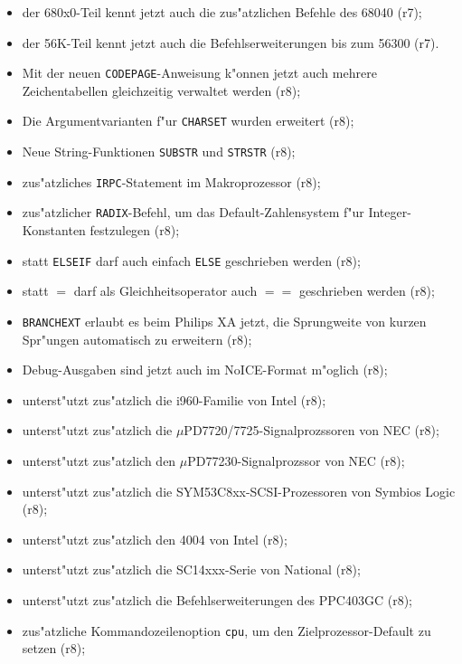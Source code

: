 \documentclass[12pt,a4paper,twoside]{report}
\newcommand{\tty}[1]{{\tt #1}}
\begin{document}
{\begin{itemize}
{\begin{itemize}
{            (r7);}
      \item{der 680x0-Teil kennt jetzt auch die zus"atzlichen Befehle des
            68040 (r7);}
      \item{der 56K-Teil kennt jetzt auch die Befehlserweiterungen bis zum
            56300 (r7).}
      \item{Mit der neuen \tty{CODEPAGE}-Anweisung k"onnen jetzt auch
            mehrere Zeichentabellen gleichzeitig verwaltet werden (r8);}
      \item{Die Argumentvarianten f"ur \tty{CHARSET} wurden erweitert
            (r8);}
      \item{Neue String-Funktionen \tty{SUBSTR} und \tty{STRSTR} (r8);}
      \item{zus"atzliches \tty{IRPC}-Statement im Makroprozessor (r8);}
      \item{zus"atzlicher {\tt RADIX}-Befehl, um das Default-Zahlensystem
            f"ur Integer-Konstanten festzulegen (r8);}
      \item{statt {\tt ELSEIF} darf auch einfach {\tt ELSE} geschrieben
            werden (r8);}
      \item{statt $=$ darf als Gleichheitsoperator auch $==$ geschrieben
            werden (r8);}
      \item{\tty{BRANCHEXT} erlaubt es beim Philips XA jetzt, die
            Sprungweite von kurzen Spr"ungen automatisch zu erweitern
            (r8);}
      \item{Debug-Ausgaben sind jetzt auch im NoICE-Format m"oglich (r8);}
      \item{unterst"utzt zus"atzlich die i960-Familie von Intel (r8);}
      \item{unterst"utzt zus"atzlich die $\mu$PD7720/7725-Signalprozssoren
            von NEC (r8);}
      \item{unterst"utzt zus"atzlich den $\mu$PD77230-Signalprozssor von
            NEC (r8);}
      \item{unterst"utzt zus"atzlich die SYM53C8xx-SCSI-Prozessoren von
            Symbios Logic (r8);}
      \item{unterst"utzt zus"atzlich den 4004 von Intel (r8);}
      \item{unterst"utzt zus"atzlich die SC14xxx-Serie von National (r8);}
      \item{unterst"utzt zus"atzlich die Befehlserweiterungen des PPC403GC
            (r8);}
      \item{zus"atzliche Kommandozeilenoption {\tt cpu}, um den
            Zielprozessor-Default zu setzen (r8);}

\end{itemize}}
\end{itemize}}
\end{document}
